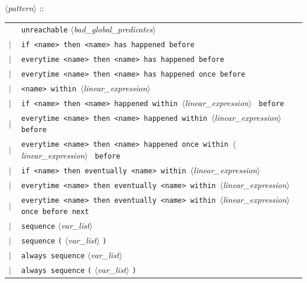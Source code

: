 \documentclass[a4paper,11pt]{report}
\newcommand{\nt}[1]{$\langle$\emph{#1}$\rangle$}
\newcommand{\regleGrammaire}[1]{\bigskip \noindent \nt{#1} :: \\}
\newcommand{\styleIMI}[1]{\textcolor{imicolor}{\texttt{#1}}}
\begin{document}
\regleGrammaire{pattern}
\begin{tabular}{l l}
	\  & \styleIMI{unreachable} \nt{bad\_global\_predicates} \\
	$|$ & \styleIMI{if <name> then <name> has happened before} \\
	$|$ & \styleIMI{everytime <name> then <name> has happened before} \\
	$|$ & \styleIMI{everytime <name> then <name> has happened once before} \\
	$|$ & \styleIMI{<name> within }\nt{linear\_expression} \styleIMI{} \\
	$|$ & \styleIMI{if <name> then <name> happened within }\nt{linear\_expression} \styleIMI{ before} \\
	$|$ & \styleIMI{everytime <name> then <name> happened within }\nt{linear\_expression} \styleIMI{ before} \\
	$|$ & \styleIMI{everytime <name> then <name> happened once within }\nt{linear\_expression} \styleIMI{ before} \\
	$|$ & \styleIMI{if <name> then eventually <name> within }\nt{linear\_expression} \styleIMI{} \\
	$|$ & \styleIMI{everytime <name> then eventually <name> within }\nt{linear\_expression} \styleIMI{} \\
	$|$ & \styleIMI{everytime <name> then eventually <name> within }\nt{linear\_expression} \styleIMI{ once before next} \\
	$|$ & \styleIMI{sequence} \nt{var\_list} \\
	$|$ & \styleIMI{sequence} \styleIMI{(} \nt{var\_list} \styleIMI{)} \\
	$|$ & \styleIMI{always sequence} \nt{var\_list} \\
	$|$ & \styleIMI{always sequence} \styleIMI{(} \nt{var\_list} \styleIMI{)} \\
\end{tabular}


\end{document}

